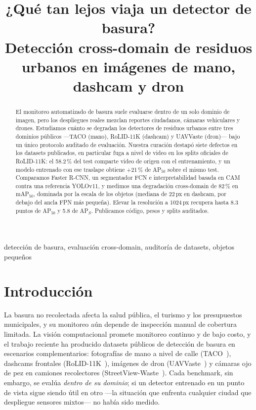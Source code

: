 \documentclass[conference]{IEEEtran}
\begin{document}
\title{¿Qué tan lejos viaja un detector de basura?\\
Detección cross-domain de residuos urbanos en imágenes de mano, dashcam y dron}

\author{
}

\maketitle

\begin{abstract}
El monitoreo automatizado de basura suele evaluarse dentro de un solo dominio de
imagen, pero los despliegues reales mezclan reportes ciudadanos, cámaras
vehiculares y drones. Estudiamos cuánto se degradan los detectores de residuos
urbanos entre tres dominios públicos ---TACO (mano), RoLID-11K (dashcam) y
UAVVaste (dron)--- bajo un único protocolo auditado de evaluación. Nuestra
curación destapó siete defectos en los datasets publicados, en particular fuga a
nivel de video en los splits oficiales de RoLID-11K: el 58.2\,\% del test
comparte video de origen con el entrenamiento, y un modelo entrenado con ese
traslape obtiene +21\,\% de AP$_{50}$ sobre el mismo test. Comparamos Faster
R-CNN, un segmentador FCN e interpretabilidad basada en CAM contra una
referencia YOLOv11, y medimos una degradación cross-domain de 82\,\% en
mAP$_{50}$, dominada por la escala de los objetos (mediana de 22\,px en dashcam,
por debajo del ancla FPN más pequeña). Elevar la resolución a 1024\,px recupera
hasta 8.3 puntos de AP$_{50}$ y 5.8 de AP$_S$. Publicamos código, pesos y splits
auditados.
\end{abstract}

\begin{IEEEkeywords}
detección de basura, evaluación cross-domain, auditoría de datasets, objetos pequeños
\end{IEEEkeywords}

\section{Introducción}
La basura no recolectada afecta la salud pública, el turismo y los presupuestos
municipales, y su monitoreo aún depende de inspección manual de cobertura
limitada. La visión computacional promete monitoreo continuo y de bajo costo, y
el trabajo reciente ha producido datasets públicos de detección de basura en
escenarios complementarios: fotografías de mano a nivel de calle
(TACO~\cite{taco}), dashcams frontales (RoLID-11K~\cite{rolid}), imágenes de
dron (UAVVaste~\cite{uavvaste}) y cámaras ojo de pez en camiones recolectores
(StreetView-Waste~\cite{streetview}). Cada benchmark, sin embargo, se evalúa
\emph{dentro de su dominio}; si un detector entrenado en un punto de vista sigue
siendo útil en otro ---la situación que enfrenta cualquier ciudad que despliegue
sensores mixtos--- no había sido medido.
\end{document}
